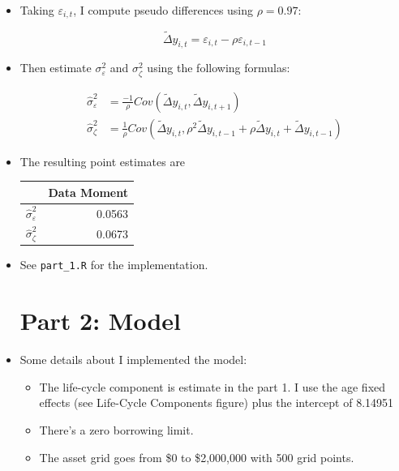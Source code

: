 \documentclass{article}
\begin{document}
\begin{itemize}
\item Taking $\varepsilon_{i,t}$, I compute pseudo differences using $\rho = 0.97$:

$$
\tilde{\Delta} y_{i,t} = \varepsilon_{i,t} - \rho \varepsilon_{i,t-1}
$$

\item Then estimate $\sigma_\varepsilon^2$ and $\sigma_\zeta^2$ using the following formulas:


\begin{align*}
\hat{\sigma}_\varepsilon^2 &= \frac{-1}{\rho} Cov(\tilde{\Delta} y_{i,t}, \tilde{\Delta} y_{i,t+1})\\
\hat{\sigma}_\zeta^2 &= \frac{1}{\rho} Cov(\tilde{\Delta} y_{i,t}, \rho^2 \tilde{\Delta} y_{i,t-1} + \rho \tilde{\Delta} y_{i,t} + \tilde{\Delta} y_{i,t-1})
\end{align*}

\item The resulting point estimates are 

\begin{center}
\begin{tabular}{ l | r}
& Data Moment\\
\hline
$\hat{\sigma}_\varepsilon^2$  & 0.0563 \\  
$\hat{\sigma}_\zeta^2$ & 0.0673
\end{tabular}
\end{center}

\item See \texttt{part\_1.R} for the implementation.

\pagebreak

\section{Part 2: Model}

\item Some details about I implemented the model:

\begin{itemize}

\item The life-cycle component is estimate in the part 1.  I use the age fixed effects (see Life-Cycle Components figure) plus the intercept of 8.14951

\item There's a zero borrowing limit.

\item The asset grid goes from \$0 to \$2,000,000 with 500 grid points.


\end{itemize}
\end{itemize}
\end{document}
